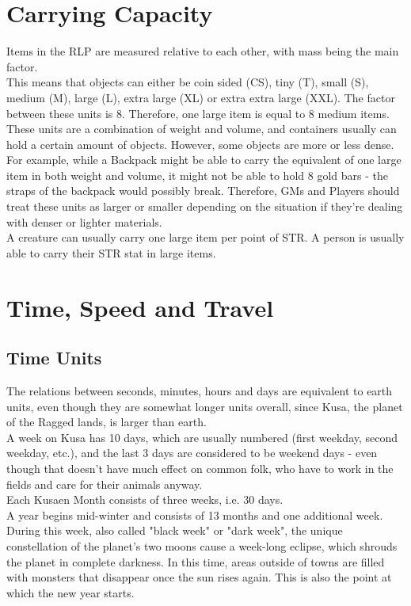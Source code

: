 \section{Carrying Capacity}
Items in the RLP are measured relative to each other, with mass being the main factor.\\
This means that objects can either be coin sided (CS), tiny (T), small (S), medium (M), large (L), extra large (XL) or extra extra large (XXL). The factor between these units is 8. Therefore, one large item is equal to 8 medium items.
These units are a combination of weight and volume, and containers usually can hold a certain amount of objects. However, some objects are more or less dense. For example, while a Backpack might be able to carry the equivalent of one large item in both weight and volume, it might not be able to hold 8 gold bars - the straps of the backpack would possibly break. Therefore, GMs and Players should treat these units as larger or smaller depending on the situation if they're dealing with denser or lighter materials.\\
A creature can usually carry one large item per point of STR. 
A person is usually able to carry their STR stat in large items.\\


\section{Time, Speed and Travel}
\subsection{Time Units}
The relations between seconds, minutes, hours and days are equivalent to earth units, even though they are somewhat longer units overall, since Kusa, the planet of the Ragged lands, is larger than earth.\\

A week on Kusa has 10 days, which are usually numbered (first weekday, second weekday, etc.), and the last 3 days are considered to be weekend days - even though that doesn't have much effect on common folk, who have to work in the fields and care for their animals anyway.\\

Each Kusaen Month consists of three weeks, i.e. 30 days.\\

A year begins mid-winter and consists of 13 months and one additional week. During this week, also called "black week" or "dark week", the unique constellation of the planet's two moons cause a week-long eclipse, which shrouds the planet in complete darkness. In this time, areas outside of towns are filled with monsters that disappear once the sun rises again. This is also the point at which the new year starts.\\

